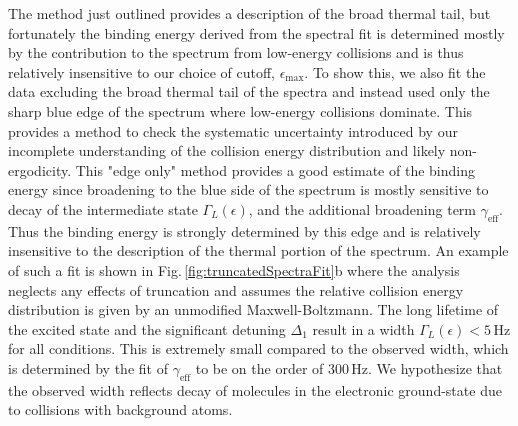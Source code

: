 The method just outlined provides a description of the broad thermal tail, but fortunately the binding energy derived from the spectral fit is determined mostly by the contribution to the spectrum from low-energy collisions and is thus relatively insensitive to our choice of cutoff, $\epsilon_{\text{max}}$. 
To show this, we also fit the data excluding the broad thermal tail of the spectra and instead used only the sharp blue edge of the spectrum where low-energy collisions dominate.
This provides a method to check the systematic uncertainty introduced by our incomplete understanding of the collision energy distribution and likely non-ergodicity. 
This "edge only" method provides a good estimate of the binding energy since broadening to the blue side of the spectrum is mostly sensitive to decay of the intermediate state $\Gamma_L(\epsilon)$, and the additional broadening term $\gamma_{\text{eff}}$.
Thus the binding energy is strongly determined by this edge and is relatively insensitive to the description of the thermal portion of the spectrum.
An example of such a fit is shown in Fig.\,\ref{fig:truncatedSpectraFit}b where the analysis neglects any effects of truncation and assumes the relative collision energy distribution is given by an unmodified Maxwell-Boltzmann.
The long lifetime of the excited state and the significant detuning $\Delta_1$ result in a width $\Gamma_L(\epsilon) < 5\,\text{Hz}$ for all conditions.
This is extremely small compared to the observed width, which is determined by the fit of $\gamma_{\text{eff}}$ to be on the order of $300\,\text{Hz}$.
We hypothesize that the observed width reflects decay of molecules in the electronic ground-state due to collisions with background atoms.


